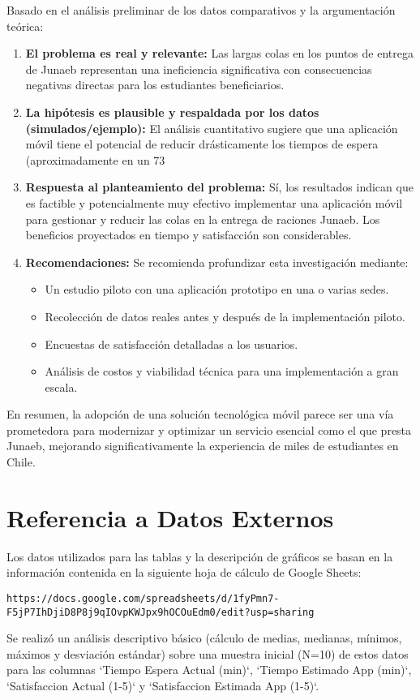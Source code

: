 \documentclass[11pt, a4paper]{article}
\begin{document}
Basado en el análisis preliminar de los datos comparativos y la argumentación teórica:

\begin{enumerate}
    \item \textbf{El problema es real y relevante:} Las largas colas en los puntos de entrega de Junaeb representan una ineficiencia significativa con consecuencias negativas directas para los estudiantes beneficiarios.
    \item \textbf{La hipótesis es plausible y respaldada por los datos (simulados/ejemplo):} El análisis cuantitativo sugiere que una aplicación móvil tiene el potencial de reducir drásticamente los tiempos de espera (aproximadamente en un 73%
    \item \textbf{Respuesta al planteamiento del problema:} Sí, los resultados indican que es factible y potencialmente muy efectivo implementar una aplicación móvil para gestionar y reducir las colas en la entrega de raciones Junaeb. Los beneficios proyectados en tiempo y satisfacción son considerables.
    \item \textbf{Recomendaciones:} Se recomienda profundizar esta investigación mediante:
        \begin{itemize}
            \item Un estudio piloto con una aplicación prototipo en una o varias sedes.
            \item Recolección de datos reales antes y después de la implementación piloto.
            \item Encuestas de satisfacción detalladas a los usuarios.
            \item Análisis de costos y viabilidad técnica para una implementación a gran escala.
        \end{itemize}
\end{enumerate}

En resumen, la adopción de una solución tecnológica móvil parece ser una vía prometedora para modernizar y optimizar un servicio esencial como el que presta Junaeb, mejorando significativamente la experiencia de miles de estudiantes en Chile.

\appendix
\section{Referencia a Datos Externos}
Los datos utilizados para las tablas y la descripción de gráficos se basan en la información contenida en la siguiente hoja de cálculo de Google Sheets:
\begin{verbatim}
https://docs.google.com/spreadsheets/d/1fyPmn7-F5jP7IhDjiD8P8j9qIOvpKWJpx9hOCOuEdm0/edit?usp=sharing
\end{verbatim}
Se realizó un análisis descriptivo básico (cálculo de medias, medianas, mínimos, máximos y desviación estándar) sobre una muestra inicial (N=10) de estos datos para las columnas `Tiempo Espera Actual (min)`, `Tiempo Estimado App (min)`, `Satisfaccion Actual (1-5)` y `Satisfaccion Estimada App (1-5)`.

\end{document}
